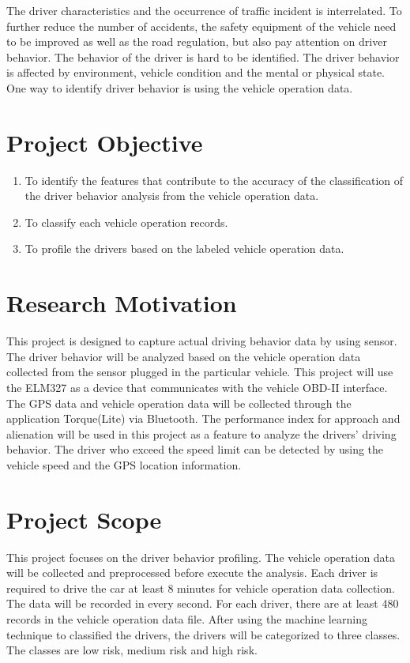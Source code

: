 The driver characteristics and the occurrence of traffic incident is interrelated. To further reduce the number of accidents, the safety equipment of the vehicle need to be improved as well as the road regulation, but also pay attention on driver behavior. The behavior of the driver is hard to be identified. The driver behavior is affected by environment, vehicle condition and the mental or physical state. One way to identify driver behavior is using the vehicle operation data.

\section{Project Objective}
\begin{enumerate}
\item To identify the features that contribute to the accuracy of the classification of the driver behavior analysis from the vehicle operation data.
\item To classify each vehicle operation records.
\item To profile the drivers based on the labeled vehicle operation data.
\end{enumerate}

\section{Research Motivation}
This project is designed to capture actual driving behavior data by using sensor. The driver behavior will be analyzed based on the vehicle operation data collected from the sensor plugged in the particular vehicle.  
This project will use the ELM327 as a device that communicates with the vehicle OBD-II interface. The GPS data and vehicle operation data will be collected through the application Torque(Lite) via Bluetooth. 
The performance index for approach and alienation will be used in this project as a feature to analyze the drivers' driving behavior. The driver who exceed the speed limit can be detected by using the vehicle speed and the GPS location information.

\section{Project Scope}
This project focuses on the driver behavior profiling. The vehicle operation data will be collected and preprocessed before execute the analysis. Each driver is required to drive the car at least 8 minutes for vehicle operation data collection. The data will be recorded in every second. For each driver, there are at least 480 records in the vehicle operation data file. After using the machine learning technique to classified the drivers, the drivers will be categorized to three classes. The classes are low risk, medium risk and high risk. 

